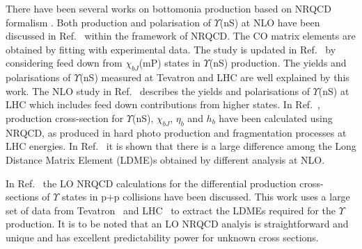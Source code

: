 There have been several works on bottomonia production based on
NRQCD formalism \cite{Domenech:1999qg,Domenech:2000ri,Braaten:2000cm,Gong:2010bk,Sharma:2012dy}.
Both production and polarisation of $\Upsilon$(nS) at NLO have been discussed in 
Ref.~\cite{Gong:2013qka} within the framework of NRQCD. The CO matrix elements are obtained
by fitting with experimental data. The study is updated in Ref.~\cite{Feng:2015wka} by considering
feed down from $\chi_{bJ}$(mP) states in $\Upsilon$(nS) production. The yields and
polarisations of $\Upsilon$(nS) measured at Tevatron and LHC are well explained by this work.
The NLO study in Ref.~\cite{Han:2014kxa} describes the yields and polarisations of
$\Upsilon$(nS) at LHC which includes feed down contributions from
higher states. In Ref.~\cite{Yu:2017pot}, production cross-section for $\Upsilon$(nS),
$\chi_{bJ}$, $\eta_b$ and $h_b$ have been calculated using NRQCD, as produced in hard
photo production and fragmentation processes at LHC energies. 
In Ref.~\cite{Kumar:2021sek} it is shown that there is a large difference among the
Long Distance Matrix Element (LDME)s obtained by different analysis at NLO.

In Ref.~\cite{Kumar:2021sek} the LO NRQCD calculations for the differential production
cross-sections of $\Upsilon$ states in p+p collisions have been discussed. 
This work uses a large set of data from Tevatron~\cite{Acosta:2001gv} and
LHC~\cite{CMS:2013qur,LHCb:2012aa,CMS:2015xqv,ATLAS:2012lmu,CMS:2017dju} 
to extract the LDMEs required for the $\Upsilon$ production.
It is to be noted that an LO NRQCD analyis is straightforward and unique and has excellent
predictability power for unknown cross sections.

